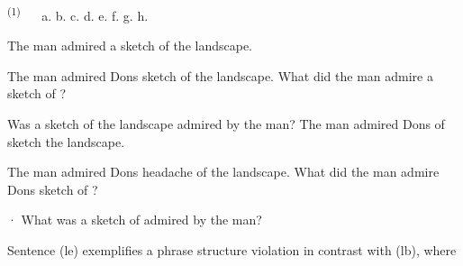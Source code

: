 \begin{multicols}{2}
\begin{styleStandard}
\textsuperscript{(1)\ \ \ \ }a. b. c. d. e. f. g. h.
\end{styleStandard}


\begin{styleStandard}
The man admired a sketch of the landscape.
\end{styleStandard}


\begin{styleStandard}
The man admired Don{\textquotesingle}s sketch of the landscape. What did the man admire a sketch of ?
\end{styleStandard}


\begin{styleStandard}
Was a sketch of the landscape admired by the man? The man admired Don{\textquotesingle}s of sketch the landscape.
\end{styleStandard}


\begin{styleStandard}
The man admired Don{\textquotesingle}s headache of the landscape. What did the man admire Don{\textquotesingle}s sketch of ?
\end{styleStandard}


\begin{styleStandard}
· What was a sketch of admired by the man?
\end{styleStandard}


\end{multicols}
\begin{styleStandard}
Sentence (le) exemplifies a phrase structure violation in contrast with (lb), where
\end{styleStandard}


